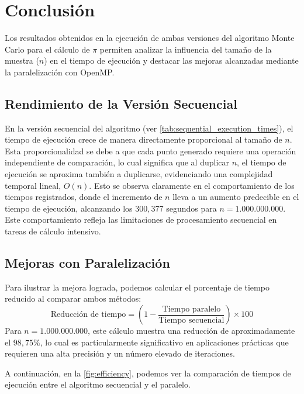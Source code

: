 \documentclass[a4paper, 10pt, onecolumn]{IEEEtran}
\begin{document}
\section{Conclusión}

Los resultados obtenidos en la ejecución de ambas versiones del algoritmo Monte Carlo para el cálculo de $\pi$ permiten analizar la influencia del tamaño de la muestra ($n$) en el tiempo de ejecución y destacar las mejoras alcanzadas mediante la paralelización con OpenMP.

\subsection{Rendimiento de la Versión Secuencial}

En la versión secuencial del algoritmo (ver \cref{tab:sequential_execution_times}), el tiempo de ejecución crece de manera directamente proporcional al tamaño de $n$. Esta proporcionalidad se debe a que cada punto generado requiere una operación independiente de comparación, lo cual significa que al duplicar $n$, el tiempo de ejecución se aproxima también a duplicarse, evidenciando una complejidad temporal lineal, $O(n)$. Esto se observa claramente en el comportamiento de los tiempos registrados, donde el incremento de $n$ lleva a un aumento predecible en el tiempo de ejecución, alcanzando los $300,377$ segundos para $n = 1.000.000.000$. Este comportamiento refleja las limitaciones de procesamiento secuencial en tareas de cálculo intensivo.

\subsection{Mejoras con Paralelización}
Para ilustrar la mejora lograda, podemos calcular el porcentaje de tiempo reducido al comparar ambos métodos:
\[
\text{Reducción de tiempo} = \left(1 - \frac{\text{Tiempo paralelo}}{\text{Tiempo secuencial}}\right) \times 100
\]
Para $n = 1.000.000.000$, este cálculo muestra una reducción de aproximadamente el $98,75\%$, lo cual es particularmente significativo en aplicaciones prácticas que requieren una alta precisión y un número elevado de iteraciones.

A continuación, en la \cref{fig:efficiency}, podemos ver la comparación de tiempos de ejecución entre el algoritmo secuencial y el paralelo.
\end{document}
